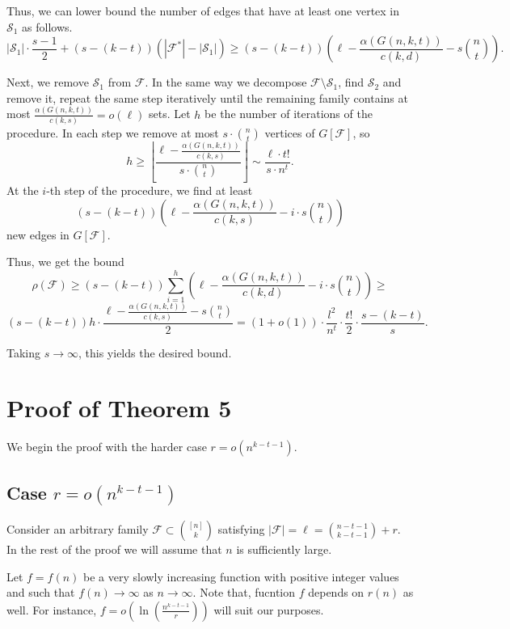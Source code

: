 \documentclass[12pt,a4paper]{article}
\newcommand{\ff}{\mathcal{F}}
\begin{document}
Thus, we can lower bound the number of edges that have at least one vertex in $\mathcal{S}_1$ as follows.  
\[ |\mathcal{S}_1| \cdot \frac{s-1}{2} + (s-(k-t))(|\mathcal{F}^*| - |\mathcal{S}_1|) \geqslant(s-(k-t)) \left(\ell - \frac{\alpha(G(n,k,t))}{c(k,d)} - s \binom{n}{t} \right).
\]

Next, we remove $\mathcal{S}_1$ from $\mathcal{F}$. In the same way we decompose $\ff \setminus \mathcal{S}_1$, find $\mathcal{S}_2$ and remove it, repeat the same step iteratively until the remaining family contains at most $\frac{\alpha(G(n,k,t))}{c(k,s)} = o(\ell)$ sets. Let $h$ be the number of iterations of the procedure. In each step we remove at most $s \cdot \binom{n}{t}$ vertices of $G[\ff]$, so 
\[
h \geqslant \left\lfloor \frac{\ell - \frac{\alpha(G(n,k,t))}{c(k,s)}}{s \cdot \binom{n}{t}} \right\rfloor \sim \frac{\ell \cdot t!}{s \cdot n^t}.
\]
At the $i$-th step of the procedure, we find at least
\[
(s-(k-t)) \left(\ell - \frac{\alpha(G(n,k,t))}{c(k,s)} - i \cdot s \binom{n}{t} \right)
\]
new edges in $G[\ff]$.

Thus, we get the bound
$$
\rho(\mathcal{F}) \geqslant (s-(k-t)) \sum_{i=1}^h \left( \ell - \frac{\alpha(G(n,k,t))}{c(k,d)} - i \cdot s \binom{n}{t} \right) \geqslant$$
$$(s-(k-t)) h \cdot \frac{\ell - \frac{\alpha(G(n,k,t))}{c(k,s)} - s \binom{n}{t}}{2} = (1+o(1)) \cdot \frac{l^2}{n^t} \cdot \frac{t!}{2} \cdot \frac{s-(k-t)}{s}.$$

Taking $s \to \infty$, this yields the desired bound.






\section{Proof of Theorem 5}\label{sec4}

We begin the proof with the harder case $r= o(n^{k-t-1})$.

\subsection{Case $r=o(n^{k-t-1})$}\label{sec41}

Consider an arbitrary family $\mathcal{F} \subset \binom{[n]}{k}$ satisfying $|\mathcal{F}| = \ell = \binom{n-t-1}{k-t-1} + r$. In the rest of the proof we will assume that $n$ is sufficiently large.

Let $f=f(n)$ be a very slowly increasing function with positive integer values and such that $f(n) \to \infty$ as $n \to \infty$. Note that, fucntion $f$ depends on $r(n)$ as well. For instance, $f = o\left(\ln\left(\frac{n^{k-t-1}}{r}\right)\right)$ will suit our purposes.
\end{document}
